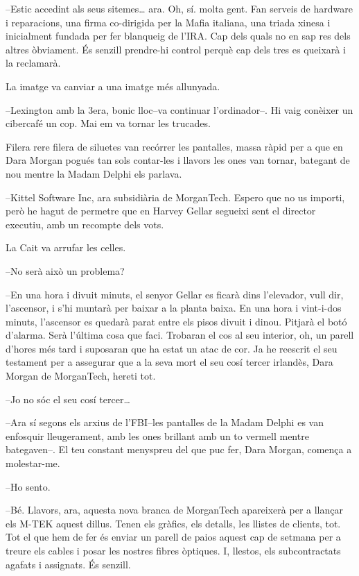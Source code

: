 --Estic accedint als seus sitemes\ldots{} ara. Oh, sí. molta gent. Fan
serveis de hardware i reparacions, una firma co-dirigida per la Mafia
italiana, una triada xinesa i inicialment fundada per fer blanqueig de
l'IRA. Cap dels quals no en sap res dels altres òbviament. És senzill
prendre-hi control perquè cap dels tres es queixarà i la reclamarà.

La imatge va canviar a una imatge més allunyada.

--Lexington amb la 3era, bonic lloc--va continuar l'ordinador--. Hi vaig
conèixer un cibercafé un cop. Mai em va tornar les trucades.

Filera rere filera de siluetes van recórrer les pantalles, massa ràpid
per a que en Dara Morgan pogués tan sols contar-les i llavors les ones
van tornar, bategant de nou mentre la Madam Delphi els parlava.

--Kittel Software Inc, ara subsidiària de MorganTech. Espero que no us
importi, però he hagut de permetre que en Harvey Gellar segueixi sent el
director executiu, amb un recompte dels vots.

La Cait va arrufar les celles.

--No serà això un problema?

--En una hora i divuit minuts, el senyor Gellar es ficarà dins
l'elevador, vull dir, l'ascensor, i s'hi muntarà per baixar a la planta
baixa. En una hora i vint-i-dos minuts, l'ascensor es quedarà parat
entre els pisos divuit i dinou. Pitjarà el botó d'alarma. Serà l'última
cosa que faci. Trobaran el cos al seu interior, oh, un parell d'hores
més tard i suposaran que ha estat un atac de cor. Ja he reescrit el seu
testament per a assegurar que a la seva mort el seu cosí tercer
irlandès, Dara Morgan de MorganTech, hereti tot.

--Jo no sóc el seu cosí tercer\ldots{}

--Ara sí segons els arxius de l'FBI--les pantalles de la Madam Delphi es
van enfosquir lleugerament, amb les ones brillant amb un to vermell
mentre bategaven--. El teu constant menyspreu del que puc fer, Dara
Morgan, comença a molestar-me.

--Ho sento.

--Bé. Llavors, ara, aquesta nova branca de MorganTech apareixerà per a
llançar els M-TEK aquest dillus. Tenen els gràfics, els detalls, les
llistes de clients, tot. Tot el que hem de fer és enviar un parell de
paios aquest cap de setmana per a treure els cables i posar les nostres
fibres òptiques. I, llestos, els subcontractats agafats i assignats. És
senzill.

